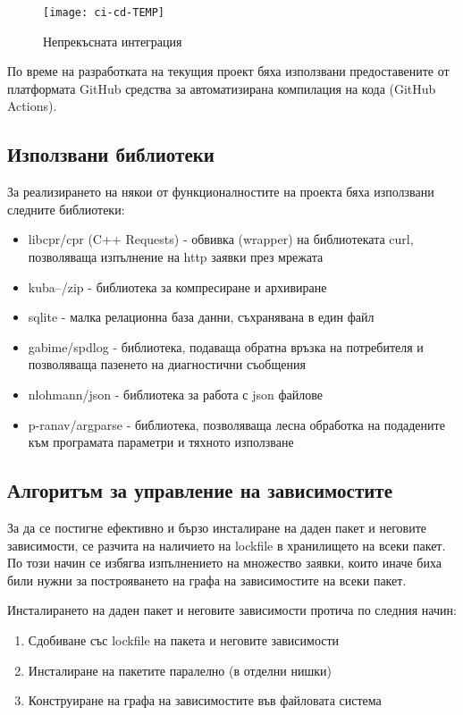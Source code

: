 \begin{figure}[h]
    \centering
    \texttt{[image: ci-cd-TEMP]}
    \caption{Непрекъсната интеграция}
    \label{fig:ci-cd}
\end{figure}

По време на разработката на текущия проект бяха използвани предоставените от
платформата GitHub средства за автоматизирана компилация на кода (GitHub
Actions).


\subsection{Използвани библиотеки}

За реализирането на някои от функционалностите на проекта бяха използвани
следните библиотеки:

\begin{itemize}
    \item libcpr/cpr (C++ Requests) - обвивка (wrapper) на библиотеката curl,
          позволяваща изпълнение на \acrshort{http} заявки през мрежата
    \item kuba--/zip - библиотека за компресиране и архивиране
    \item sqlite - малка релационна база данни, съхранявана в един файл
    \item gabime/spdlog - библиотека, подаваща обратна връзка на потребителя и
          позволяваща пазенето на диагностични съобщения
    \item nlohmann/json - библиотека за работа с \acrshort{json} файлове
    \item p-ranav/argparse - библиотека, позволяваща лесна обработка на подадените към
          програмата параметри и тяхното използване
\end{itemize}


\subsection{Алгоритъм за управление на зависимостите}

За да се постигне ефективно и бързо инсталиране на даден пакет и неговите
зависимости, се разчита на наличието на lockfile в хранилището на всеки пакет.
По този начин се избягва изпълнението на множество заявки, които иначе биха били
нужни за построяването на графа на зависимостите на всеки пакет.

Инсталирането на даден пакет и неговите зависимости протича по следния начин:

\begin{enumerate}
    \item Сдобиване със lockfile на пакета и неговите зависимости
    \item Инсталиране на пакетите паралелно (в отделни нишки)
    \item Конструиране на графа на зависимостите във файловата система
\end{enumerate}

